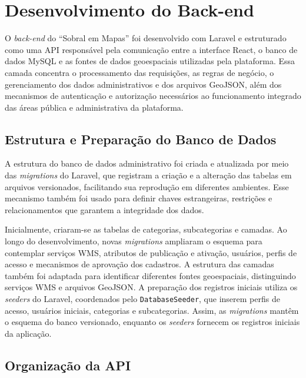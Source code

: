 \section{Desenvolvimento do Back-end}
\label{sec:desenvolvimento-backend}

O \textit{back-end} do ``Sobral em Mapas'' foi desenvolvido com Laravel e estruturado como uma API responsável pela comunicação entre a interface React, o banco de dados MySQL e as fontes de dados geoespaciais utilizadas pela plataforma. Essa camada concentra o processamento das requisições, as regras de negócio, o gerenciamento dos dados administrativos e dos arquivos GeoJSON, além dos mecanismos de autenticação e autorização necessários ao funcionamento integrado das áreas pública e administrativa da plataforma.

\subsection{Estrutura e Preparação do Banco de Dados}
\label{sec:migrations-seeders}

A estrutura do banco de dados administrativo foi criada e atualizada por meio das \textit{migrations} do Laravel, que registram a criação e a alteração das tabelas em arquivos versionados, facilitando sua reprodução em diferentes ambientes. Esse mecanismo também foi usado para definir chaves estrangeiras, restrições e relacionamentos que garantem a integridade dos dados.

Inicialmente, criaram-se as tabelas de categorias, subcategorias e camadas. Ao longo do desenvolvimento, novas \textit{migrations} ampliaram o esquema para contemplar serviços WMS, atributos de publicação e ativação, usuários, perfis de acesso e mecanismos de aprovação dos cadastros. A estrutura das camadas também foi adaptada para identificar diferentes fontes geoespaciais, distinguindo serviços WMS e arquivos GeoJSON. A preparação dos registros iniciais utiliza os \textit{seeders} do Laravel, coordenados pelo \texttt{DatabaseSeeder}, que inserem perfis de acesso, usuários iniciais, categorias e subcategorias. Assim, as \textit{migrations} mantêm o esquema do banco versionado, enquanto os \textit{seeders} fornecem os registros iniciais da aplicação.

\subsection{Organização da API}
\label{sec:organizacao-api}

